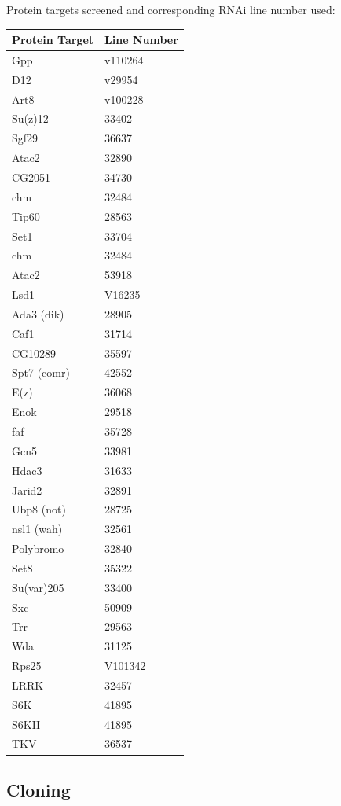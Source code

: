 \documentclass[12pt,oneside]{reedthesis}
\begin{document}
Protein targets screened and corresponding RNAi line number used:
\begin{longtable}[]{@{}ll@{}}
\toprule
Protein Target & Line Number \\
\midrule
\endhead
Gpp & v110264 \\
D12 & v29954 \\
Art8 & v100228 \\
Su(z)12 & 33402 \\
Sgf29 & 36637 \\
Atac2 & 32890 \\
CG2051 & 34730 \\
chm & 32484 \\
Tip60 & 28563 \\
Set1 & 33704 \\
chm & 32484 \\
Atac2 & 53918 \\
Lsd1 & V16235 \\
Ada3 (dik) & 28905 \\
Caf1 & 31714 \\
CG10289 & 35597 \\
Spt7 (comr) & 42552 \\
E(z) & 36068 \\
Enok & 29518 \\
faf & 35728 \\
Gcn5 & 33981 \\
Hdac3 & 31633 \\
Jarid2 & 32891 \\
Ubp8 (not) & 28725 \\
nsl1 (wah) & 32561 \\
Polybromo & 32840 \\
Set8 & 35322 \\
Su(var)205 & 33400 \\
Sxc & 50909 \\
Trr & 29563 \\
Wda & 31125 \\
Rps25 & V101342 \\
LRRK & 32457 \\
S6K & 41895 \\
S6KII & 41895 \\
TKV & 36537 \\
\bottomrule
\end{longtable}
\hypertarget{cloning}{%
\subsection{Cloning}\label{cloning}}
\end{document}
